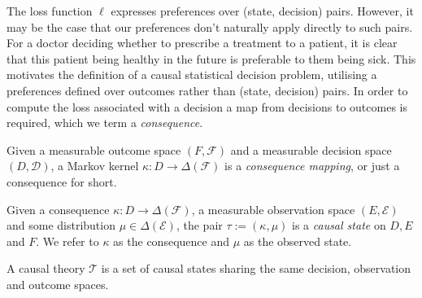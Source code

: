The loss function $\ell$ expresses preferences over (state, decision) pairs. However, it may be the case that our preferences don't naturally apply directly to such pairs. For a doctor deciding whether to prescribe a treatment to a patient, it is clear that this patient being healthy in the future is preferable to them being sick. This motivates the definition of a causal statistical decision problem, utilising a preferences defined over outcomes rather than (state, decision) pairs. In order to compute the loss associated with a decision a map from decisions to outcomes is required, which we term a \emph{consequence}.



\begin{definition}[Consequences]
Given a measurable outcome space $(F,\mathcal{F})$ and a measurable decision space $(D,\mathcal{D})$, a Markov kernel $\kappa:D \to \Delta(\mathcal{F})$ is a \emph{consequence mapping}, or just a consequence for short.
\end{definition}

\begin{definition}
Given a consequence $\kappa:D\to \Delta(\mathcal{F})$, a measurable observation space $(E,\mathcal{E})$ and some distribution $\mu\in \Delta(\mathcal{E})$, the pair $\tau:=(\kappa,\mu)$ is a \emph{causal state} on $D, E$ and $F$. We refer to $\kappa$ as the consequence and $\mu$ as the observed state.
\end{definition}

\begin{definition}\label{def:causal_theory}
A causal theory $\mathscr{T}$ is a set of causal states sharing the same decision, observation and outcome spaces.
\end{definition}




